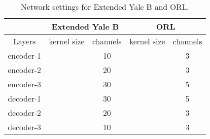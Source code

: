 \documentclass[10pt,twocolumn,letterpaper]{article}
\begin{document}
\begin{table}[t]
\center
\small
\begin{tabular}{c | cc | cc }
\hline
     & \multicolumn{2}{c|}{\textbf{Extended Yale B}} & \multicolumn{2}{c}{\textbf{ORL}}\\
\hline
    Layers & kernel size & channels & kernel size & channels \\
\hline
    encoder-1 &  & 10 &  & 3 \\
    encoder-2 &  & 20 &  & 3 \\
    encoder-3 &  & 30 &  & 5 \\
    decoder-1 &  & 30 &  & 5 \\
    decoder-2 &  & 20 &  & 3 \\
    decoder-3 &  & 10 &  & 3 \\
\hline
\end{tabular}
\caption{Network settings for Extended Yale B and ORL.}
\label{tab:Network-settings-ExYaleB-ORL-COIL20}
\end{table}
\end{document}
